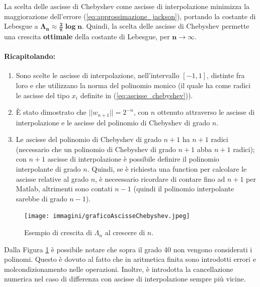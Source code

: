 \begin{remark}
	La scelta delle ascisse di Chebyshev come ascisse di interpolazione minimizza la maggiorazione dell'errore (\ref{eq:approssimazione_jackson}), portando la costante di Lebesgue a $\boldsymbol{\Lambda_n\approx\frac{2}{\pi}\log n}$. Quindi, la scelta delle ascisse di Chebyshev permette una crescita \textbf{ottimale} della costante di Lebesgue, per $\boldsymbol{n\rightarrow\infty}$.
\end{remark}

\paragraph{Ricapitolando:} 
\begin{enumerate}
	\item Sono scelte le ascisse di interpolazione, nell'intervallo $[-1,1]$, distinte fra loro e che utilizzano la norma del \gls{polinomio monico} (il quale ha come radici le ascisse del tipo $x_i$ definite in (\ref{eq:ascisse_chebyshev})). 
	
	\item È stato dimostrato che $||w_{n+1}||=2^{-n}$, con $n$ ottenuto attraverso le ascisse di interpolazione e le ascisse del polinomio di Chebyshev di grado $n$. 
	
	\item Le ascisse del polinomio di Chebyshev di grado $n+1$ ha $n+1$ radici (necessario che un polinomio di Chebyshev di grado $n+1$ abba $n+1$ radici); con $n+1$ ascisse di interpolazione è possibile definire il polinomio interpolante di grado $n$. Quindi, se è richiesta una function per calcolare le ascisse relative al grado $n$, è neceessario ricordare di contare fino ad $n+1$ per Matlab, altrimenti sono contati $n-1$ (quindi il polinomio interpolante sarebbe di grado $n-1$).
\end{enumerate}

\begin{figure}
    \centering
    \texttt{[image: immagini/graficoAscisseChebyshev.jpeg]}
    \caption{Esempio di crescita di $\Lambda_n$ al crescere di $n$.}\label{fig:graficoAscisseChebyshev}
\end{figure}

Dalla Figura \ref{fig:graficoAscisseChebyshev} è possibile notare che sopra il grado 40 non vengono considerati i polinomi. Questo è dovuto al fatto che in aritmetica finita sono introdotti errori e molcondizionamento nelle operazioni. Inoltre, è introdotta la cancellazione numerica nel caso di differenza con ascisse di interpolazione sempre più vicine.

